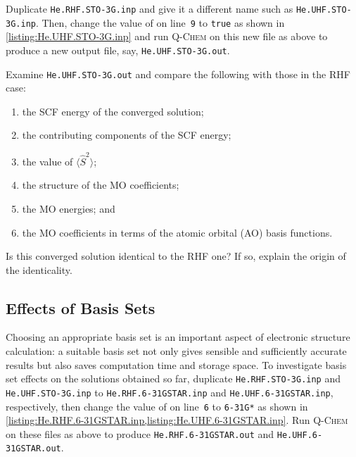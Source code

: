 		Duplicate \texttt{He.RHF.STO-3G.inp} and give it a different name such as \texttt{He.UHF.STO-3G.inp}.
		Then, change the value of  on line~\texttt{9} to \texttt{true} as shown in \cref{listing:He.UHF.STO-3G.inp} and run \textsc{Q-Chem} on this new file as above to produce a new output file, say, \texttt{He.UHF.STO-3G.out}.
			
			\begin{Task}
				Examine \texttt{He.UHF.STO-3G.out} and compare the following with those in the RHF case: 
				\begin{enumerate}[topsep=0pt,itemsep=-1ex,partopsep=1ex,parsep=1ex,label=(\alph*)]
					\item the SCF energy of the converged solution;
					\item the contributing components of the SCF energy;
					\item the value of $\langle \hat{S}^2 \rangle$;
					\item the structure of the MO coefficients;
					\item the MO energies; and
					\item the MO coefficients in terms of the atomic orbital (AO) basis functions.
				\end{enumerate}
				Is this converged solution identical to the RHF one? If so, explain the origin of the identicality.
			\end{Task}

		
	\subsection{Effects of Basis Sets}
		Choosing an appropriate basis set is an important aspect of electronic structure calculation: a suitable basis set not only gives sensible and sufficiently accurate results but also saves computation time and storage space.
		To investigate basis set effects on the solutions obtained so far, duplicate \texttt{He.RHF.STO-3G.inp} and \texttt{He.UHF.STO-3G.inp} to \texttt{He.RHF.6-31GSTAR.inp} and \texttt{He.UHF.6-31GSTAR.inp}, respectively, then change the value of  on line~\texttt{6} to \texttt{6-31G*} as shown in \cref{listing:He.RHF.6-31GSTAR.inp,listing:He.UHF.6-31GSTAR.inp}.
 		Run \textsc{Q-Chem} on these files as above to produce \texttt{He.RHF.6-31GSTAR.out} and \texttt{He.UHF.6-31GSTAR.out}.
			
			

